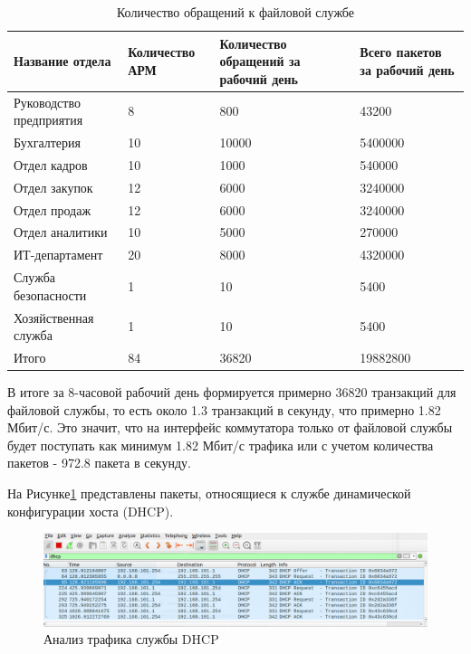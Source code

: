 \begin{table}[H]
\centering
{}
\caption{Количество обращений к файловой службе\;\label{table:NFS_usage}}
\small
\begin{tabularx}{\textwidth}{|X|X|X|X|}
\hline
	Название отдела	&	Количество АРМ	&	Количество обращений за рабочий день	&	Всего пакетов за рабочий день \\ \hline
		Руководство предприятия         & 8       		&  	800					&	43200  \\
		\hline
		Бухгалтерия						& 10         	&  	10000				&	5400000  \\
        \hline
		Отдел кадров					& 10         	&  	1000				&	540000  \\
        \hline
		Отдел закупок					& 12         	&  	6000				&	3240000  \\
        \hline
		Отдел продаж					& 12         	&  	6000				&	3240000  \\
        \hline
		Отдел аналитики					& 10         	&  	5000				&	270000  \\
        \hline
		ИТ-департамент					& 20         	&  	8000				&	4320000  \\
        \hline
		Служба безопасности				& 1				& 	10					&	5400	  \\
		\hline
		Хозяйственная служба			& 1         	&  	10					&	5400  \\
        \hline
		Итого							& 84			&	36820				& 	19882800 \\  
		\hline
\end{tabularx}
\end{table}

В итоге за 8-часовой рабочий день формируется примерно 36820 транзакций для файловой службы, то есть около 1.3 транзакций в секунду, что примерно 1.82 Мбит/с. Это значит, что на интерфейс коммутатора только от файловой службы будет поступать как минимум 1.82 Мбит/с трафика или с учетом количества пакетов - 972.8 пакета в секунду. 



На Рисунке\;\ref{fig:DHCP_wireshark} представлены пакеты, относящиеся к службе динамической конфигурации хоста (DHCP). 

\begin{figure}[H]
\centering
\includegraphics[scale=0.4]{../misc/DHCP_wireshark.png}
\caption{Анализ трафика службы DHCP\label{fig:DHCP_wireshark}}
\end{figure}

